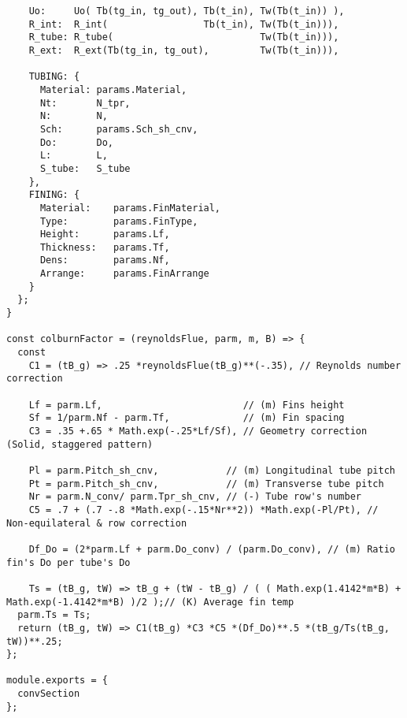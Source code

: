 \begin{verbatim}
    Uo:     Uo( Tb(tg_in, tg_out), Tb(t_in), Tw(Tb(t_in)) ),
    R_int:  R_int(                 Tb(t_in), Tw(Tb(t_in))),
    R_tube: R_tube(                          Tw(Tb(t_in))),
    R_ext:  R_ext(Tb(tg_in, tg_out),         Tw(Tb(t_in))),

    TUBING: {
      Material: params.Material,
      Nt:       N_tpr,
      N:        N,
      Sch:      params.Sch_sh_cnv,
      Do:       Do,
      L:        L,
      S_tube:   S_tube
    },
    FINING: {
      Material:    params.FinMaterial,
      Type:        params.FinType,
      Height:      params.Lf,
      Thickness:   params.Tf,
      Dens:        params.Nf,
      Arrange:     params.FinArrange
    }
  };
}

const colburnFactor = (reynoldsFlue, parm, m, B) => {
  const
    C1 = (tB_g) => .25 *reynoldsFlue(tB_g)**(-.35), // Reynolds number correction

    Lf = parm.Lf,                         // (m) Fins height
    Sf = 1/parm.Nf - parm.Tf,             // (m) Fin spacing
    C3 = .35 +.65 * Math.exp(-.25*Lf/Sf), // Geometry correction (Solid, staggered pattern)

    Pl = parm.Pitch_sh_cnv,            // (m) Longitudinal tube pitch
    Pt = parm.Pitch_sh_cnv,            // (m) Transverse tube pitch
    Nr = parm.N_conv/ parm.Tpr_sh_cnv, // (-) Tube row's number
    C5 = .7 + (.7 -.8 *Math.exp(-.15*Nr**2)) *Math.exp(-Pl/Pt), // Non-equilateral & row correction

    Df_Do = (2*parm.Lf + parm.Do_conv) / (parm.Do_conv), // (m) Ratio fin's Do per tube's Do

    Ts = (tB_g, tW) => tB_g + (tW - tB_g) / ( ( Math.exp(1.4142*m*B) + Math.exp(-1.4142*m*B) )/2 );// (K) Average fin temp
  parm.Ts = Ts;
  return (tB_g, tW) => C1(tB_g) *C3 *C5 *(Df_Do)**.5 *(tB_g/Ts(tB_g, tW))**.25;
};

module.exports = {
  convSection
};
\end{verbatim}

